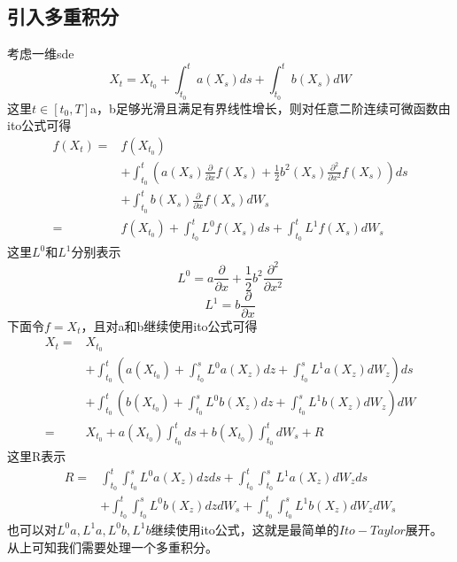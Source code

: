 \documentclass{article}%
\begin{document}
\subsection{引入多重积分}
考虑一维sde
\begin{equation}
X_{t}=X_{t_{0}}+\int_{t_{0}}^{t} a\left(X_{s}\right) d s+\int_{t_{0}}^{t} b\left(X_{s}\right) d W
\end{equation}
这里$t\in[t_0,T]$a，b足够光滑且满足有界线性增长，则对任意二阶连续可微函数由ito公式可得
\begin{equation}
\begin{aligned}
f\left(X_{t}\right)=& f\left(X_{t_{0}}\right) \\
&+\int_{t_{0}}^{t}\left(a\left(X_{s}\right) \frac{\partial}{\partial x} f\left(X_{s}\right)+\frac{1}{2} b^{2}\left(X_{s}\right) \frac{\partial^{2}}{\partial x^{2}} f\left(X_{s}\right)\right) d s \\
&+\int_{t_{0}}^{t} b\left(X_{s}\right) \frac{\partial}{\partial x} f\left(X_{s}\right) d W_{s} \\
=& f\left(X_{t_{0}}\right)+\int_{t_{0}}^{t} L^{0} f\left(X_{s}\right) d s+\int_{t_{0}}^{t} L^{1} f\left(X_{s}\right) d W_{s}
\end{aligned}
\end{equation}
这里$L^0$和$L^1$分别表示
\begin{equation}
L^{0}=a \frac{\partial}{\partial x}+\frac{1}{2} b^{2} \frac{\partial^{2}}{\partial x^{2}}
\end{equation}
\begin{equation}
L^{1}=b \frac{\partial}{\partial x}
\end{equation}
下面令$f=X_t$，且对a和b继续使用ito公式可得
\begin{equation}
\begin{aligned}
X_{t}=& X_{t_{0}} \\
&+\int_{t_{0}}^{t}\left(a\left(X_{t_{0}}\right)+\int_{t_{0}}^{s} L^{0} a\left(X_{z}\right) d z+\int_{t_{0}}^{s} L^{1} a\left(X_{z}\right) d W_{z}\right) d s \\
&+\int_{t_{0}}^{t}\left(b\left(X_{t_{0}}\right)+\int_{t_{0}}^{s} L^{0} b\left(X_{z}\right) d z+\int_{t_{0}}^{s} L^{1} b\left(X_{z}\right) d W_{z}\right) d W \\
=& X_{t_{0}}+a\left(X_{t_{0}}\right) \int_{t_{0}}^{t} d s+b\left(X_{t_{0}}\right) \int_{t_{0}}^{t} d W_{s}+R
\end{aligned}
\end{equation}
这里R表示
$$
\begin{aligned}
R=& \int_{t_{0}}^{t} \int_{t_{0}}^{s} L^{0} a\left(X_{z}\right) d z d s+\int_{t_{0}}^{t} \int_{t_{0}}^{s} L^{1} a\left(X_{z}\right) d W_{z} d s \\
&+\int_{t_{0}}^{t} \int_{t_{0}}^{s} L^{0} b\left(X_{z}\right) d z d W_{s}+\int_{t_{0}}^{t} \int_{t_{0}}^{s} L^{1} b\left(X_{z}\right) d W_{z} d W_{s}
\end{aligned}
$$
也可以对$L^0a,L^1a,L^0b,L^1b$继续使用ito公式，这就是最简单的$Ito-Taylor$展开。从上可知我们需要处理一个多重积分。
\end{document}
